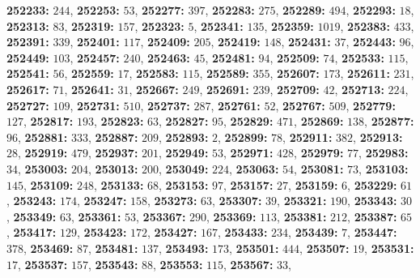 \textsf{\bfseries 252233:} $244$, \textsf{\bfseries 252253:} $53$, \textsf{\bfseries 252277:} $397$, \textsf{\bfseries 252283:} $275$, \textsf{\bfseries 252289:} $494$, \textsf{\bfseries 252293:} $18$, \textsf{\bfseries 252313:} $83$, \textsf{\bfseries 252319:} $157$, \textsf{\bfseries 252323:} $5$, \textsf{\bfseries 252341:} $135$, \textsf{\bfseries 252359:} $1019$, \textsf{\bfseries 252383:} $433$, \textsf{\bfseries 252391:} $339$, \textsf{\bfseries 252401:} $117$, \textsf{\bfseries 252409:} $205$, \textsf{\bfseries 252419:} $148$, \textsf{\bfseries 252431:} $37$, \textsf{\bfseries 252443:} $96$, \textsf{\bfseries 252449:} $103$, \textsf{\bfseries 252457:} $240$, \textsf{\bfseries 252463:} $45$, \textsf{\bfseries 252481:} $94$, \textsf{\bfseries 252509:} $74$, \textsf{\bfseries 252533:} $115$, \textsf{\bfseries 252541:} $56$, \textsf{\bfseries 252559:} $17$, \textsf{\bfseries 252583:} $115$, \textsf{\bfseries 252589:} $355$, \textsf{\bfseries 252607:} $173$, \textsf{\bfseries 252611:} $231$, \textsf{\bfseries 252617:} $71$, \textsf{\bfseries 252641:} $31$, \textsf{\bfseries 252667:} $249$, \textsf{\bfseries 252691:} $239$, \textsf{\bfseries 252709:} $42$, \textsf{\bfseries 252713:} $224$, \textsf{\bfseries 252727:} $109$, \textsf{\bfseries 252731:} $510$, \textsf{\bfseries 252737:} $287$, \textsf{\bfseries 252761:} $52$, \textsf{\bfseries 252767:} $509$, \textsf{\bfseries 252779:} $127$, \textsf{\bfseries 252817:} $193$, \textsf{\bfseries 252823:} $63$, \textsf{\bfseries 252827:} $95$, \textsf{\bfseries 252829:} $471$, \textsf{\bfseries 252869:} $138$, \textsf{\bfseries 252877:} $96$, \textsf{\bfseries 252881:} $333$, \textsf{\bfseries 252887:} $209$, \textsf{\bfseries 252893:} $2$, \textsf{\bfseries 252899:} $78$, \textsf{\bfseries 252911:} $382$, \textsf{\bfseries 252913:} $28$, \textsf{\bfseries 252919:} $479$, \textsf{\bfseries 252937:} $201$, \textsf{\bfseries 252949:} $53$, \textsf{\bfseries 252971:} $428$, \textsf{\bfseries 252979:} $77$, \textsf{\bfseries 252983:} $34$, \textsf{\bfseries 253003:} $204$, \textsf{\bfseries 253013:} $200$, \textsf{\bfseries 253049:} $224$, \textsf{\bfseries 253063:} $54$, \textsf{\bfseries 253081:} $73$, \textsf{\bfseries 253103:} $145$, \textsf{\bfseries 253109:} $248$, \textsf{\bfseries 253133:} $68$, \textsf{\bfseries 253153:} $97$, \textsf{\bfseries 253157:} $27$, \textsf{\bfseries 253159:} $6$, \textsf{\bfseries 253229:} $61$, \textsf{\bfseries 253243:} $174$, \textsf{\bfseries 253247:} $158$, \textsf{\bfseries 253273:} $63$, \textsf{\bfseries 253307:} $39$, \textsf{\bfseries 253321:} $190$, \textsf{\bfseries 253343:} $30$, \textsf{\bfseries 253349:} $63$, \textsf{\bfseries 253361:} $53$, \textsf{\bfseries 253367:} $290$, \textsf{\bfseries 253369:} $113$, \textsf{\bfseries 253381:} $212$, \textsf{\bfseries 253387:} $65$, \textsf{\bfseries 253417:} $129$, \textsf{\bfseries 253423:} $172$, \textsf{\bfseries 253427:} $167$, \textsf{\bfseries 253433:} $234$, \textsf{\bfseries 253439:} $7$, \textsf{\bfseries 253447:} $378$, \textsf{\bfseries 253469:} $87$, \textsf{\bfseries 253481:} $137$, \textsf{\bfseries 253493:} $173$, \textsf{\bfseries 253501:} $444$, \textsf{\bfseries 253507:} $19$, \textsf{\bfseries 253531:} $17$, \textsf{\bfseries 253537:} $157$, \textsf{\bfseries 253543:} $88$, \textsf{\bfseries 253553:} $115$, \textsf{\bfseries 253567:} $33$, 
